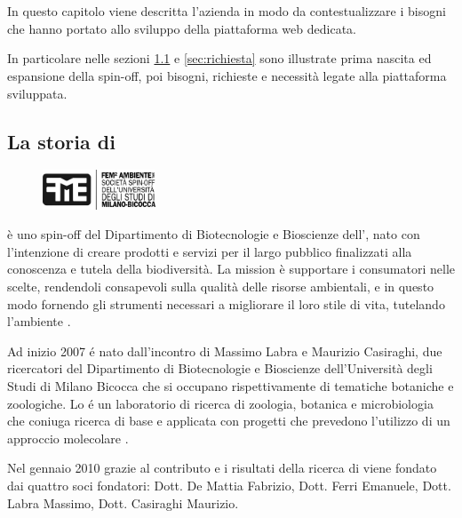 \chapter{\fem}
\label{chp:fem}

In questo capitolo viene descritta l'azienda \textbf{\femsrl} in modo da contestualizzare i bisogni che hanno portato allo sviluppo della piattaforma web dedicata.

In particolare nelle sezioni \ref{sec:storia-fem} e \ref{sec:richiesta} sono illustrate prima nascita ed espansione della spin-off, poi bisogni, richieste e necessità legate alla piattaforma sviluppata.

\section{La storia di \fem}
\label{sec:storia-fem}

\begin{figure}
  \begin{center}
    \includegraphics[width=0.3\textwidth]{images/logo-fem}
  \end{center}
\end{figure}

\textbf{\femsrl} è uno spin-off del Dipartimento di Biotecnologie e Bioscienze dell'{\unimib}, nato con l'intenzione di creare prodotti e servizi per il largo pubblico finalizzati alla conoscenza e tutela della biodiversità. La mission è supportare i consumatori nelle scelte, rendendoli consapevoli sulla qualità delle risorse ambientali, e in questo modo fornendo gli strumenti necessari a migliorare il loro stile di vita, tutelando l'ambiente \cite{fem2ambiente}.

Ad inizio 2007 é nato \textbf{\zpl} dall'incontro di Massimo Labra e Maurizio Casiraghi, due ricercatori del Dipartimento di Biotecnologie e Bioscienze dell'Università degli Studi di Milano Bicocca che si occupano rispettivamente di tematiche botaniche e zoologiche. Lo {\zpl} é un laboratorio di ricerca di zoologia, botanica e microbiologia che coniuga ricerca di base e applicata con progetti che prevedono l'utilizzo di un approccio molecolare \cite{zooplantlab}.

Nel gennaio 2010 grazie al contributo e i risultati della ricerca di {\zpl} viene fondato {\femsrl} dai quattro soci fondatori: Dott. De Mattia Fabrizio, Dott. Ferri Emanuele, Dott. Labra Massimo, Dott. Casiraghi Maurizio.

